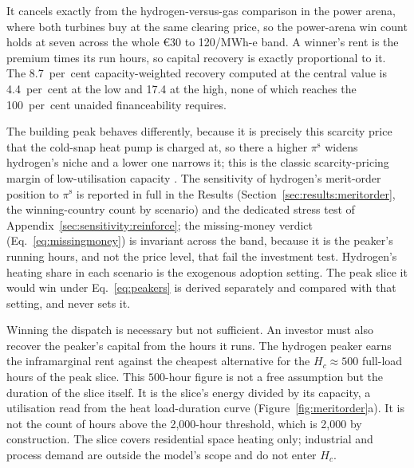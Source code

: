 It cancels exactly from the hydrogen-versus-gas comparison in the power arena, where
both turbines buy at the same clearing price, so the power-arena win count holds at
seven across the whole \euro{}30 to 120/MWh-e band. A winner's rent is the premium times
its run hours, so capital recovery is exactly proportional to it. The 8.7~per~cent capacity-weighted recovery
computed at the central value is 4.4~per~cent at the low and 17.4 at the high, none of
which reaches the 100~per~cent unaided financeability requires.

The building peak behaves differently, because it is precisely this scarcity price that
the cold-snap heat pump is charged at, so there a higher $\pi^{\mathrm{s}}$ widens
hydrogen's niche and a lower one narrows it; this is the classic scarcity-pricing margin of low-utilisation capacity
\citep{Joskow2008capacity}. The sensitivity of hydrogen's merit-order position to
$\pi^{\mathrm{s}}$ is reported in full in the Results
(Section~\ref{sec:results:meritorder}, the winning-country count by scenario) and the
dedicated stress test of Appendix~\ref{sec:sensitivity:reinforce}; the missing-money
verdict (Eq.~\eqref{eq:missingmoney}) is invariant across the band, because it is the
peaker's running hours, and not the price level, that fail the investment test.
Hydrogen's heating share in each scenario is the exogenous adoption setting. The peak slice it would win under Eq.~\eqref{eq:peakers} is derived separately and compared with that setting, and never sets it.

Winning the dispatch is necessary but not sufficient. An investor must also recover the
peaker's capital from the hours it runs. The hydrogen peaker earns the inframarginal
rent against the cheapest alternative for the $H_{c}\approx500$ full-load hours of the
peak slice. This $500$-hour figure is not a free assumption but the duration of the
slice itself. It is the slice's energy divided by its capacity, a utilisation read from
the heat load-duration curve (Figure~\ref{fig:meritorder}a). It is not the count of
hours above the 2{,}000-hour threshold, which is 2{,}000 by construction. The slice
covers residential space heating only; industrial and process demand are outside the
model's scope and do not enter $H_{c}$.

